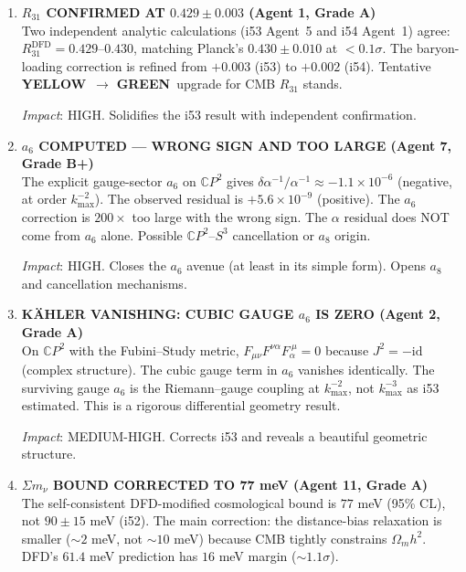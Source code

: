\documentclass[11pt,a4paper]{article}
\newcommand{\GREEN}{\textcolor{dfdgreen}{\textbf{GREEN}}}
\newcommand{\YELLOW}{\textcolor{dfdyellow}{\textbf{YELLOW}}}
\newcommand{\CP}{\mathbb{C}P}
\begin{document}
\begin{enumerate}[label=\textbf{\arabic*.}, leftmargin=1.5cm]
\textit{Impact}: HIGHEST STRATEGIC. If executed, Phase 0A --- the critical bottleneck since i41 --- would finally be broken.

\item \textbf{$R_{31}$ CONFIRMED AT $0.429 \pm 0.003$ (Agent 1, Grade A)}\\
Two independent analytic calculations (i53 Agent~5 and i54 Agent~1) agree: $R_{31}^{\mathrm{DFD}} = 0.429$--$0.430$, matching Planck's $0.430 \pm 0.010$ at $< 0.1\sigma$. The baryon-loading correction is refined from $+0.003$ (i53) to $+0.002$ (i54). Tentative \YELLOW\ $\to$ \GREEN\ upgrade for CMB $R_{31}$ stands.

\textit{Impact}: HIGH. Solidifies the i53 result with independent confirmation.

\item \textbf{$a_6$ COMPUTED --- WRONG SIGN AND TOO LARGE (Agent 7, Grade B+)}\\
The explicit gauge-sector $a_6$ on $\CP^2$ gives $\delta\alpha^{-1}/\alpha^{-1} \approx -1.1 \times 10^{-6}$ (negative, at order $k_{\max}^{-2}$). The observed residual is $+5.6 \times 10^{-9}$ (positive). The $a_6$ correction is $200\times$ too large with the wrong sign. The $\alpha$ residual does NOT come from $a_6$ alone. Possible $\CP^2$--$S^3$ cancellation or $a_8$ origin.

\textit{Impact}: HIGH. Closes the $a_6$ avenue (at least in its simple form). Opens $a_8$ and cancellation mechanisms.

\item \textbf{K\"AHLER VANISHING: CUBIC GAUGE $a_6$ IS ZERO (Agent 2, Grade A)}\\
On $\CP^2$ with the Fubini--Study metric, $F_{\mu\nu}F^{\nu\alpha}F_{\alpha}^{\ \mu} = 0$ because $J^2 = -\mathrm{id}$ (complex structure). The cubic gauge term in $a_6$ vanishes identically. The surviving gauge $a_6$ is the Riemann--gauge coupling at $k_{\max}^{-2}$, not $k_{\max}^{-3}$ as i53 estimated. This is a rigorous differential geometry result.

\textit{Impact}: MEDIUM-HIGH. Corrects i53 and reveals a beautiful geometric structure.

\item \textbf{$\Sigma m_\nu$ BOUND CORRECTED TO 77 meV (Agent 11, Grade A)}\\
The self-consistent DFD-modified cosmological bound is $77$ meV (95\% CL), not $90 \pm 15$ meV (i52). The main correction: the distance-bias relaxation is smaller ($\sim 2$ meV, not $\sim 10$ meV) because CMB tightly constrains $\Omega_m h^2$. DFD's $61.4$ meV prediction has $16$ meV margin ($\sim 1.1\sigma$).


\end{enumerate}
\end{document}
